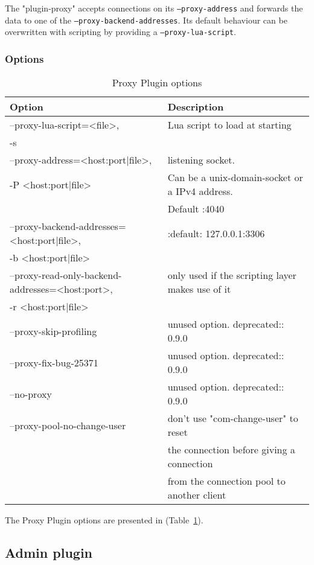 The "plugin-proxy" accepts connections on its \texttt{--proxy-address} and forwards the data to one of the \texttt{--proxy-backend-addresses}.
Its default behaviour can be overwritten with scripting by providing a \texttt{--proxy-lua-script}.

\subsubsection{Options}

\begin{table}[h!]
\centering
	\footnotesize
    \begin{tabular}{ | l | l |}
    \hline
    Option & Description \\ \hline
    --proxy-lua-script=<file>, & Lua script to load at starting \\
 	-s & \\ \hline
	--proxy-address=<host:port|file>,  & listening socket.\\
	 -P <host:port|file> & Can be a unix-domain-socket or a IPv4 address.\\
	& Default :4040 \\ \hline
	--proxy-backend-addresses=<host:port|file>, & :default: 127.0.0.1:3306\\
	 -b <host:port|file> & \\ \hline
	--proxy-read-only-backend-addresses=<host:port>, & only used if the scripting layer makes use of it\\
	 -r <host:port|file> & \\ \hline
  	--proxy-skip-profiling & unused option. deprecated:: 0.9.0 \\ \hline
	 --proxy-fix-bug-25371 & unused option. deprecated:: 0.9.0 \\ \hline
	--no-proxy & unused option. deprecated:: 0.9.0 \\ \hline
	--proxy-pool-no-change-user & don't use "com-change-user" to reset\\
	& the connection before giving a connection \\
	& from the connection pool to another client \\	
    \hline
    \end{tabular}

\caption{Proxy Plugin options}
\label{tab:proxy_plugin_options}
\end{table}

The Proxy Plugin options are presented in (Table~\ref{tab:proxy_plugin_options}).

\subsection{Admin plugin}

